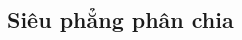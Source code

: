 \subsection{Siêu phẳng phân chia}
\label{section:separate_hyperplan}
\begin{theorem}
    
\end{theorem}
